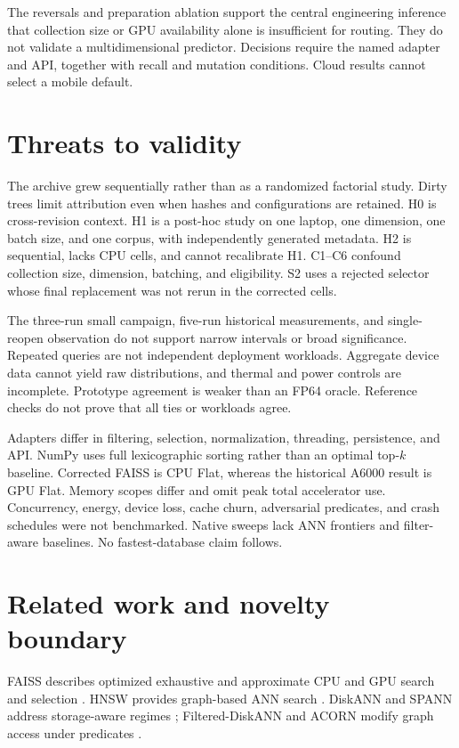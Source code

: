 \documentclass[10pt]{article}
\begin{document}
The reversals and preparation ablation support the central engineering inference that collection size or GPU availability alone is insufficient for routing. They do not validate a multidimensional predictor. Decisions require the named adapter and API, together with recall and mutation conditions. Cloud results cannot select a mobile default.

\section{Threats to validity}
The archive grew sequentially rather than as a randomized factorial study. Dirty trees limit attribution even when hashes and configurations are retained. H0 is cross-revision context. H1 is a post-hoc study on one laptop, one dimension, one batch size, and one corpus, with independently generated metadata. H2 is sequential, lacks CPU cells, and cannot recalibrate H1. C1--C6 confound collection size, dimension, batching, and eligibility. S2 uses a rejected selector whose final replacement was not rerun in the corrected cells.

The three-run small campaign, five-run historical measurements, and single-reopen observation do not support narrow intervals or broad significance. Repeated queries are not independent deployment workloads. Aggregate device data cannot yield raw distributions, and thermal and power controls are incomplete. Prototype agreement is weaker than an FP64 oracle. Reference checks do not prove that all ties or workloads agree.

Adapters differ in filtering, selection, normalization, threading, persistence, and API. NumPy uses full lexicographic sorting rather than an optimal top-$k$ baseline. Corrected FAISS is CPU Flat, whereas the historical A6000 result is GPU Flat. Memory scopes differ and omit peak total accelerator use. Concurrency, energy, device loss, cache churn, adversarial predicates, and crash schedules were not benchmarked. Native sweeps lack ANN frontiers and filter-aware baselines. No fastest-database claim follows.

\section{Related work and novelty boundary}
FAISS describes optimized exhaustive and approximate CPU and GPU search and selection \citep{johnson2019billion,douze2024faiss}. HNSW provides graph-based ANN search \citep{malkov2020hnsw}. DiskANN and SPANN address storage-aware regimes \citep{subramanya2019diskann,chen2021spann}; Filtered-DiskANN and ACORN modify graph access under predicates \citep{gollapudi2023filtered,patel2024acorn}.
\end{document}
